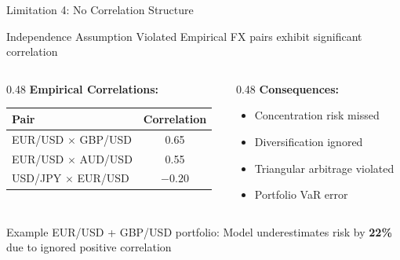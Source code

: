 \documentclass[11pt,aspectratio=169]{beamer}
\begin{document}
	\begin{frame}{Limitation 4: No Correlation Structure}
		\begin{block}{Independence Assumption Violated}
			Empirical FX pairs exhibit significant correlation
		\end{block}
		
		\vspace{0.2cm}
		
		\begin{columns}[T]
			\begin{column}{0.48\textwidth}
				\textbf{Empirical Correlations:}
				\scriptsize
				\begin{table}
					\begin{tabular}{|l|c|}
						\hline
						\textbf{Pair} & \textbf{Correlation} \\
						\hline
						EUR/USD $\times$ GBP/USD & 0.65 \\
						EUR/USD $\times$ AUD/USD & 0.55 \\
						USD/JPY $\times$ EUR/USD & $-0.20$ \\
						\hline
					\end{tabular}
				\end{table}
				\normalsize
			\end{column}
			
			\begin{column}{0.48\textwidth}
				\textbf{Consequences:}
				\begin{itemize}
					\item Concentration risk missed
					\item Diversification ignored
					\item Triangular arbitrage violated
					\item Portfolio VaR error
				\end{itemize}
			\end{column}
		\end{columns}
		
		\vspace{0.3cm}
		
		\begin{exampleblock}{Example}
			EUR/USD + GBP/USD portfolio: Model underestimates risk by \textbf{22\%} due to ignored positive correlation
		\end{exampleblock}
	\end{frame}
	
	
\end{document}
